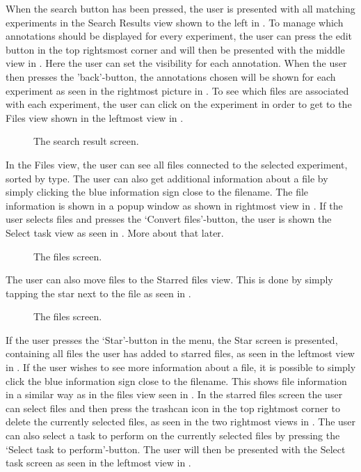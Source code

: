 When the search button has been pressed, the user is presented with all matching experiments in the Search Results view shown to the left in . To manage which annotations should be displayed for every experiment, the user can press the edit button in the top rightsmost corner and will then be presented with the middle view in . Here the user can set the visibility for each annotation. When the user then presses the ’back’-button, the annotations chosen will be shown for each experiment as seen in the rightmost picture in . To see which files are associated with each experiment, the user can click on the experiment in order to get to the Files view shown in the leftmost view in .

\begin{figure}[ht]
\caption{The search result screen.}
\label{fig:ios_searchResult}
\end{figure}
\FloatBarrier
In the Files view, the user can see all files connected to the selected experiment, sorted by type. The user can also get additional information about a file by simply clicking the blue information sign close to the filename. The file information is shown in a popup window as shown in rightmost view in . If the user selects files and presses the ‘Convert files’-button, the user is shown the Select task view as seen in . More about that later.

\begin{figure}[htb]
\caption{The files screen.}
\label{fig:ios_files1}
\end{figure}
\FloatBarrier
The user can also move files to the Starred files view. This is done by simply tapping the star next to the file as seen in .

\begin{figure}[htb]
\caption{The files screen.}
\label{fig:ios_files3}
\end{figure}
\FloatBarrier

If the user presses the ‘Star’-button in the menu, the Star screen is presented, containing all files the user has added to starred files, as seen in the leftmost view in . If the user wishes to see more information about a file, it is possible to simply click the blue information sign close to the filename. This shows file information in a similar way as in the files view seen in . In the starred files screen the user can select files and then press the trashcan icon in the top rightmost corner to delete the currently selected files, as seen in the two rightmost views in . The user can also select a task to perform on the currently selected files by pressing the ‘Select task to perform’-button. The user will then be presented with the Select task screen as seen in the leftmost view in .

